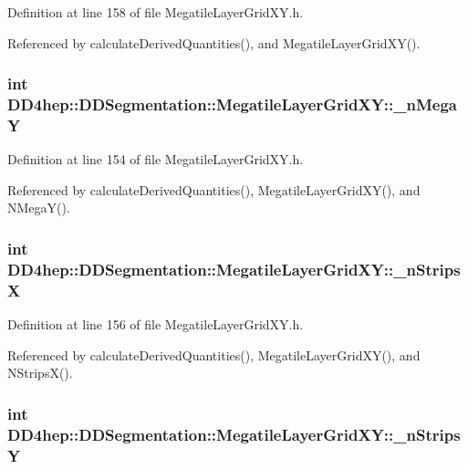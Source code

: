 Definition at line 158 of file MegatileLayerGridXY.h.

Referenced by calculateDerivedQuantities(), and MegatileLayerGridXY().\hypertarget{class_d_d4hep_1_1_d_d_segmentation_1_1_megatile_layer_grid_x_y_afbd476c007a88c207aa09e12b43c8be7}{
\subsubsection[{\_\-nMegaY}]{\setlength{\rightskip}{0pt plus 5cm}int {\bf DD4hep::DDSegmentation::MegatileLayerGridXY::\_\-nMegaY}}}
\label{class_d_d4hep_1_1_d_d_segmentation_1_1_megatile_layer_grid_x_y_afbd476c007a88c207aa09e12b43c8be7}


Definition at line 154 of file MegatileLayerGridXY.h.

Referenced by calculateDerivedQuantities(), MegatileLayerGridXY(), and NMegaY().\hypertarget{class_d_d4hep_1_1_d_d_segmentation_1_1_megatile_layer_grid_x_y_a34d0954062dab57ef3ce16b3fc5021fe}{
\subsubsection[{\_\-nStripsX}]{\setlength{\rightskip}{0pt plus 5cm}int {\bf DD4hep::DDSegmentation::MegatileLayerGridXY::\_\-nStripsX}}}
\label{class_d_d4hep_1_1_d_d_segmentation_1_1_megatile_layer_grid_x_y_a34d0954062dab57ef3ce16b3fc5021fe}


Definition at line 156 of file MegatileLayerGridXY.h.

Referenced by calculateDerivedQuantities(), MegatileLayerGridXY(), and NStripsX().\hypertarget{class_d_d4hep_1_1_d_d_segmentation_1_1_megatile_layer_grid_x_y_a7d809f0a8f30db5a803be80e2ca833a6}{
\subsubsection[{\_\-nStripsY}]{\setlength{\rightskip}{0pt plus 5cm}int {\bf DD4hep::DDSegmentation::MegatileLayerGridXY::\_\-nStripsY}}}
\label{class_d_d4hep_1_1_d_d_segmentation_1_1_megatile_layer_grid_x_y_a7d809f0a8f30db5a803be80e2ca833a6}


